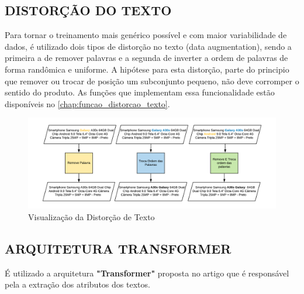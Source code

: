 \subsection{DISTORÇÃO DO TEXTO}
\label{distorcao_de_texto_chap}

Para tornar o treinamento mais genérico possível e com maior variabilidade de dados, é utilizado dois tipos de distorção no texto (data augmentation), sendo a primeira a de remover palavras e a segunda de inverter a ordem de palavras de forma randômica e uniforme. A hipótese para esta distorção, parte do principio que remover ou trocar de posição um subconjunto pequeno, não deve corromper o sentido do produto. As funções que implementam essa funcionalidade estão disponíveis no \autoref{chap:funcao_distorcao_texto}.

\begin{figure}[]
	\caption{\label{distorcao_de_texto} Visualização da Distorção de Texto}
	\begin{center}
	    \includegraphics[width=\textwidth]{artigo/recursos/imagens/distorcao_de_texto.png}
	\end{center}
\end{figure}

\subsection{ARQUITETURA TRANSFORMER}

É utilizado a arquitetura \textbf{"Transformer"} proposta no artigo \cite{transformer} que é responsável pela a extração dos atributos dos textos.

